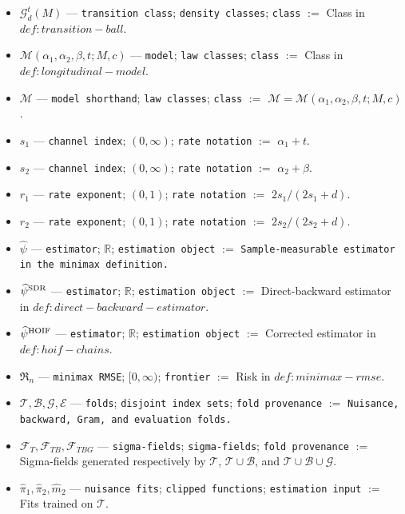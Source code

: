 \documentclass{article}
\begin{document}
\begin{itemize}
  \item \(\mathcal G_d^t(M)\) --- \texttt{transition class}; \texttt{density classes}; \texttt{class} $:=$ Class in \(def:transition-ball\).
  \item \(\mathcal M(\alpha_1,\alpha_2,\beta,t;M,c)\) --- \texttt{model}; \texttt{law classes}; \texttt{class} $:=$ Class in \(def:longitudinal-model\).
  \item \(\mathcal M\) --- \texttt{model shorthand}; \texttt{law classes}; \texttt{class} $:=$ \(\mathcal M=\mathcal M(\alpha_1,\alpha_2,\beta,t;M,c)\).
  \item \(s_1\) --- \texttt{channel index}; \((0,\infty)\); \texttt{rate notation} $:=$ \(\alpha_1+t\).
  \item \(s_2\) --- \texttt{channel index}; \((0,\infty)\); \texttt{rate notation} $:=$ \(\alpha_2+\beta\).
  \item \(r_1\) --- \texttt{rate exponent}; \((0,1)\); \texttt{rate notation} $:=$ \(2s_1/(2s_1+d)\).
  \item \(r_2\) --- \texttt{rate exponent}; \((0,1)\); \texttt{rate notation} $:=$ \(2s_2/(2s_2+d)\).
  \item \(\widehat\psi\) --- \texttt{estimator}; \(\mathbb R\); \texttt{estimation object} $:=$ \texttt{Sample-measurable estimator in the minimax definition.}
  \item \(\widehat\psi^{\rm SDR}\) --- \texttt{estimator}; \(\mathbb R\); \texttt{estimation object} $:=$ Direct-backward estimator in \(def:direct-backward-estimator\).
  \item \(\widehat\psi^{\rm HOIF}\) --- \texttt{estimator}; \(\mathbb R\); \texttt{estimation object} $:=$ Corrected estimator in \(def:hoif-chains\).
  \item \(\mathfrak R_n\) --- \texttt{minimax RMSE}; \([0,\infty)\); \texttt{frontier} $:=$ Risk in \(def:minimax-rmse\).
  \item \(\mathcal T,\mathcal B,\mathcal G,\mathcal E\) --- \texttt{folds}; \texttt{disjoint index sets}; \texttt{fold provenance} $:=$ \texttt{Nuisance, backward, Gram, and evaluation folds.}
  \item \(\mathcal F_T,\mathcal F_{TB},\mathcal F_{TBG}\) --- \texttt{sigma-fields}; \texttt{sigma-fields}; \texttt{fold provenance} $:=$ Sigma-fields generated respectively by \(\mathcal T\), \(\mathcal T\cup\mathcal B\), and \(\mathcal T\cup\mathcal B\cup\mathcal G\).
  \item \(\widehat\pi_1,\widehat\pi_2,\widehat m_2\) --- \texttt{nuisance fits}; \texttt{clipped functions}; \texttt{estimation input} $:=$ Fits trained on \(\mathcal T\).

\end{itemize}
\end{document}
